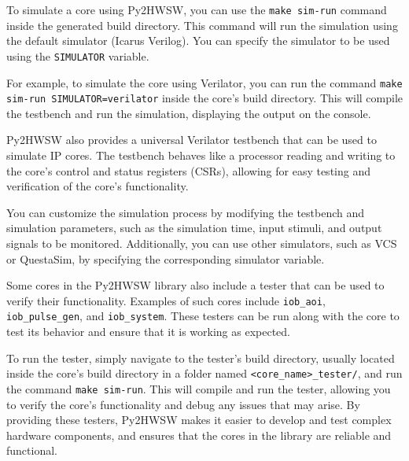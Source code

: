 %

To simulate a core using Py2HWSW, you can use the \texttt{make sim-run} command inside the generated build directory. This command will run the simulation using the default simulator (Icarus Verilog).
You can specify the simulator to be used using the \texttt{SIMULATOR} variable.

For example, to simulate the core using Verilator, you can run the command \texttt{make sim-run SIMULATOR=verilator} inside the core's build directory. This will compile the testbench and run the simulation, displaying the output on the console.

Py2HWSW also provides a universal Verilator testbench that can be used to simulate IP cores. The testbench behaves like a processor reading and writing to the core's control and status registers (CSRs), allowing for easy testing and verification of the core's functionality.

You can customize the simulation process by modifying the testbench and simulation parameters, such as the simulation time, input stimuli, and output signals to be monitored. Additionally, you can use other simulators, such as VCS or QuestaSim, by specifying the corresponding simulator variable.

Some cores in the Py2HWSW library also include a tester that can be used to verify their functionality. Examples of such cores include \texttt{iob_aoi}, \texttt{iob_pulse_gen}, and \texttt{iob_system}. These testers can be run along with the core to test its behavior and ensure that it is working as expected.

To run the tester, simply navigate to the tester's build directory, usually located inside the core's build directory in a folder named \texttt{<core_name>_tester/}, and run the command \texttt{make sim-run}.
This will compile and run the tester, allowing you to verify the core's functionality and debug any issues that may arise.
By providing these testers, Py2HWSW makes it easier to develop and test complex hardware components, and ensures that the cores in the library are reliable and functional.

